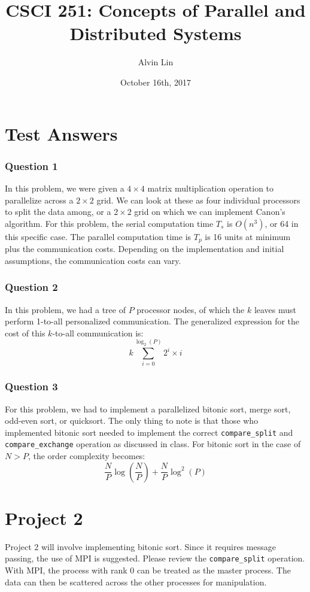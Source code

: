\documentclass[letterpaper, 12pt]{math}
\title{CSCI 251: Concepts of Parallel and Distributed Systems}
\author{Alvin Lin}
\date{October 16th, 2017}
\begin{document}
\maketitle

\section*{Test Answers}

\subsubsection*{Question 1}
In this problem, we were given a \( 4\times4 \) matrix multiplication operation
to parallelize across a \( 2\times2 \) grid. We can look at these as four
individual processors to split the data among, or a \( 2\times2 \) grid on which
we can implement Canon's algorithm. For this problem, the serial computation
time \( T_s \) is \( O(n^3) \), or 64 in this specific case. The parallel
computation time is \( T_p \) is 16 units at minimum plus the communication
costs. Depending on the implementation and initial assumptions, the
communication costs can vary.

\subsubsection*{Question 2}
In this problem, we had a tree of \( P \) processor nodes, of which the
\( k \) leaves must perform 1-to-all personalized communication. The
generalized expression for the cost of this \( k \)-to-all communication is:
\[ k\sum_{i=0}^{\log_2(P)}2^i\times i \]

\subsubsection*{Question 3}
For this problem, we had to implement a parallelized bitonic sort, merge sort,
odd-even sort, or quicksort. The only thing to note is that those who
implemented bitonic sort needed to implement the correct \texttt{compare\_split}
and \texttt{compare\_exchange} operation as discussed in class. For bitonic
sort in the case of \( N > P \), the order complexity becomes:
\[ \frac{N}{P}\log(\frac{N}{P})+\frac{N}{P}\log^2(P) \]

\section*{Project 2}
Project 2 will involve implementing bitonic sort. Since it requires message
passing, the use of MPI is suggested. Please review the \texttt{compare\_split}
operation. With MPI, the process with rank 0 can be treated as the master
process. The data can then be scattered across the other processes for
manipulation.
\end{document}
